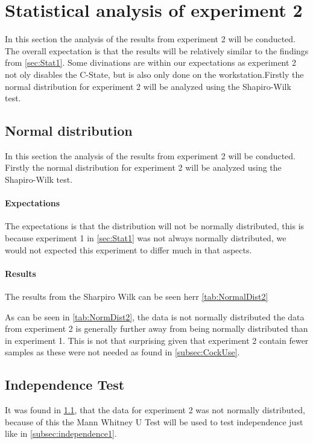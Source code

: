 \section{Statistical analysis of experiment 2}\label{sec:Stat2}
In this section the analysis of the results from experiment 2 will be conducted. The overall expectation is that the results will be relatively similar to the findings from \cref{sec:Stat1}. Some divinations are within our expectations as experiment 2 not oly disables the C-State, but is also only done on the workstation.Firstly the normal distribution for experiment 2 will be analyzed using the Shapiro-Wilk test.

\subsection{Normal distribution}\label{subsec:NormalDist2}
In this section the analysis of the results from experiment 2 will be conducted. Firstly the normal distribution for experiment 2 will be analyzed using the Shapiro-Wilk test. 

\paragraph{Expectations}
The expectations is that the distribution will not be normally distributed, this is because experiment 1 in \cref{sec:Stat1} was not always normally distributed, we would not expected this experiment to differ much in that aspects. 

\paragraph{Results}
The results from the Sharpiro Wilk can be seen herr \cref{tab:NormalDist2}
 
As can be seen in \cref{tab:NormDist2}, the data is not normally distributed the data from experiment 2 is generally further away from being normally distributed than in experiment 1. This is not that surprising given that experiment 2 contain fewer samples as these were not needed as found in \cref{subsec:CockUse}.

\subsection{Independence Test}\label{subsec:independence2}
It was found in \cref{subsec:NormalDist2}, that the data for experiment 2 was not normally distributed, because of this the Mann Whitney U Test will be used to test independence just like in \cref{subsec:independence1}.

